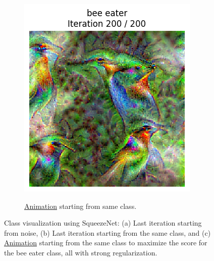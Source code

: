 \begin{figure}[H]
\begin{subfigure}{.33\textwidth}
        \includegraphics[width=\linewidth]{SqueezeNet/bird_animated_same_init_img_reg++_last_frame.png}
        \caption{}
        \label{fig:class_viz_start_image:png}
    \end{subfigure}%
    \begin{subfigure}{.33\textwidth}
        \centering
        \caption{\href{figs/2b/bird_animated_same_init_img_reg++.gif}{Animation} starting from same class.} %
        \label{fig:class_viz_start_image:vid}
    \end{subfigure}
    \caption{Class visualization using SqueezeNet: (a) Last iteration starting from noise, (b) Last iteration starting from the same class, and (c) \href{figs/2b/bird_animated_same_init_img_reg++.gif}{Animation} starting from the same class to maximize the score for the bee eater class, all with strong regularization.}
    \label{fig:class_viz_start_image}
\end{figure}

